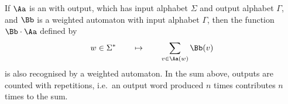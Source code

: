 \begin{lemma}\label{lem:weighted-closure} If  $\Aa$ is an \nfa with output, which has input alphabet $\Sigma$ and output alphabet $\Gamma$, and $\Bb$ is a weighted automaton with input alphabet $\Gamma$,  then the function $\Bb \cdot \Aa$ defined by 
\begin{align*}
  w \in \Sigma^* \qquad \mapsto \qquad \sum_{v \in \Aa(w)} \Bb(v)
\end{align*}
is also recognised by a weighted automaton. In the sum above, outputs are counted with repetitions, i.e.~an output word produced $n$ times contributes $n$ times to the sum.
\end{lemma}

